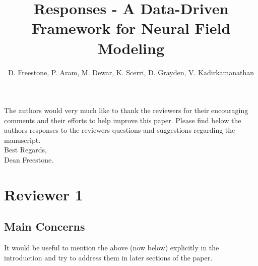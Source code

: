 \documentclass{article}
\title{Responses - A Data-Driven Framework for Neural Field Modeling}
\author{D. Freestone, P. Aram, M. Dewar, K. Scerri, D. Grayden, V. Kadirkamanathan}
\begin{document}
    \maketitle

    The authors would very much like to thank the reviewers for their encouraging comments and their efforts to help improve this paper. Please find below the authors responses to the reviewers questions and suggestions regarding the manuscript. 
\\

Best Regards,
\\

Dean Freestone.

    \section{Reviewer 1}
    
    \subsection{Main Concerns}
    It would be useful to mention the above (now below) explicitly in the introduction and try to address them in later sections of the paper.
\end{document}
